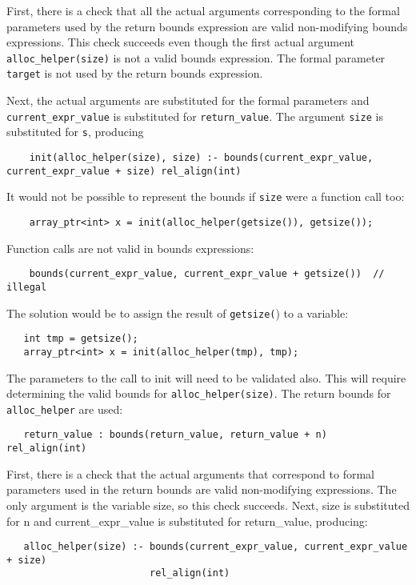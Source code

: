First, there is a check that all the actual arguments corresponding to
the formal parameters used by the return bounds expression are valid
non-modifying bounds expressions. This check succeeds even though the
first actual argument \texttt{alloc\_helper(size)} is not a valid bounds
expression. The formal parameter \texttt{target} is not used by the
return bounds expression.

Next, the actual arguments are substituted for the formal parameters and
\texttt{current\_expr\_value} is substituted for \texttt{return\_value}.
The argument \texttt{size} is substituted for \texttt{s}, producing
\begin{verbatim}
    init(alloc_helper(size), size) :- bounds(current_expr_value, current_expr_value + size) rel_align(int)
\end{verbatim}

It would not be possible to represent the bounds if \texttt{size} were a
function call too:
\begin{verbatim}
    array_ptr<int> x = init(alloc_helper(getsize()), getsize());
\end{verbatim}

Function calls are not valid in bounds expressions:

\begin{verbatim}
    bounds(current_expr_value, current_expr_value + getsize())  // illegal
\end{verbatim}

The solution would be to assign the result of \texttt{getsize(}) to a
variable:
\begin{verbatim}
   int tmp = getsize();
   array_ptr<int> x = init(alloc_helper(tmp), tmp);
\end{verbatim}

The parameters to the call to init will need to be validated also. This
will require determining the valid bounds for \texttt{alloc\_helper(size)}. The
return bounds for \texttt{alloc\_helper} are used:
\begin{verbatim}
   return_value : bounds(return_value, return_value + n) rel_align(int)
\end{verbatim}

First, there is a check that the actual arguments that correspond to
formal parameters used in the return bounds are valid non-modifying
expressions. The only argument is the variable size, so this check
succeeds. Next, size is substituted for n and current\_expr\_value is
substituted for return\_value, producing:
\begin{verbatim}
   alloc_helper(size) :- bounds(current_expr_value, current_expr_value + size) 
                         rel_align(int)
\end{verbatim}

